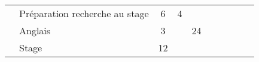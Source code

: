 \begin{tabular}{c|m{6cm}|cm{1cm}|cm{1cm}|cm{1cm}|cm{1cm}|}
 & \color{black} \mbox{Préparation} \mbox{recherche} \mbox{au} \mbox{stage}  & \color{black} 6 & \color{black} 4 & \color{black}  & \color{black}  \\ \cline{2-6}
 & \cellcolor{couleurClaire} \color{couleurTexte} \mbox{Anglais}  & \cellcolor{couleurClaire} \color{couleurTexte} 3 & \cellcolor{couleurClaire} \color{couleurTexte}  & \cellcolor{couleurClaire} \color{couleurTexte} 24 & \cellcolor{couleurClaire} \color{couleurTexte}  \\ \cline{2-6}
 & \color{black} \mbox{Stage}  & \color{black} 12 & \color{black}  & \color{black}  & \color{black}  \\ \cline{2-6}
\hline
\end{tabular}
